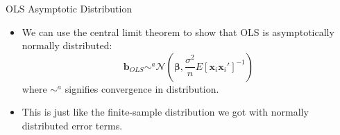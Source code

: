 \documentclass[english,xcolor={dvipsnames},aspectratio=169]{beamer}
\begin{document}
\begin{frame}{OLS Asymptotic Distribution}
\begin{itemize}
	\item We can use the central limit theorem to show that OLS is asymptotically
	normally distributed:\[
\boldsymbol{b}_{OLS}\sim^{a}\mathcal{N}\left(\boldsymbol{\beta},\frac{\sigma^{2}}{n}E\left[\boldsymbol{x}_{i}\boldsymbol{x}_{i}'\right]^{-1}\right)
\]
	where $ \sim^{a}$ signifies convergence in distribution. 

	\item This is just like the finite-sample distribution
	we got with normally distributed error terms. 
\end{itemize}
\end{frame}
\end{document}
